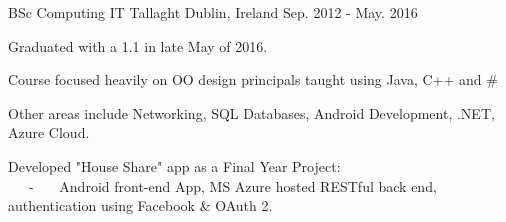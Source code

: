 

\begin{cventries}

  \cventry
    {BSc Computing} %
    {IT Tallaght} %
    {Dublin, Ireland} %
    {Sep. 2012 - May. 2016} %
    {
      \begin{cvitems} %
        \item {Graduated with a 1.1 in late May of 2016.}
        \item {Course focused heavily on OO design principals taught using Java, C++ and \#}
        \item {Other areas include Networking, SQL Databases, Android Development, .NET, Azure Cloud.}
        \item {Developed "House Share" app as a Final Year Project:  {\\}
        ~~~-~~~ Android front-end App, MS Azure hosted RESTful back end, authentication using Facebook \& OAuth 2. }
      \end{cvitems}
    }

\end{cventries}
